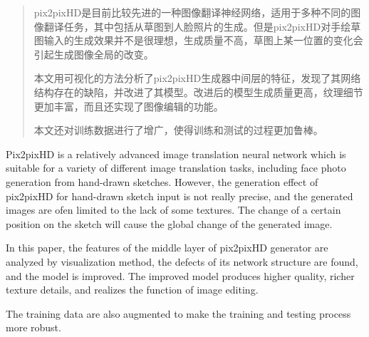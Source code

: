

\begin{abstract}
  pix2pixHD是目前比较先进的一种图像翻译神经网络，适用于多种不同的图像翻译任务，其中包括从草图到人脸照片的生成。但是pix2pixHD对手绘草图输入的生成效果并不是很理想，生成质量不高，草图上某一位置的变化会引起生成图像全局的改变。
  
  本文用可视化的方法分析了pix2pixHD生成器中间层的特征，发现了其网络结构存在的缺陷，并改进了其模型。改进后的模型生成质量更高，纹理细节更加丰富，而且还实现了图像编辑的功能。
  
  本文还对训练数据进行了增广，使得训练和测试的过程更加鲁棒。
\end{abstract}

\begin{enabstract}
  Pix2pixHD is a relatively advanced image translation neural network which is suitable for a variety of different image translation tasks, including face photo generation from hand-drawn sketches. However, the generation effect of pix2pixHD for hand-drawn sketch input is not really precise, and the generated images are ofen limited to the lack of some textures. The change of a certain position on the sketch will cause the global change of the generated image.
  
  In this paper, the features of the middle layer of pix2pixHD generator are analyzed by visualization method, the defects of its network structure are found, and the model is improved. The improved model produces higher quality, richer texture details, and realizes the function of image editing.
  
  The training data are also augmented to make the training and testing process more robust.

\end{enabstract}
